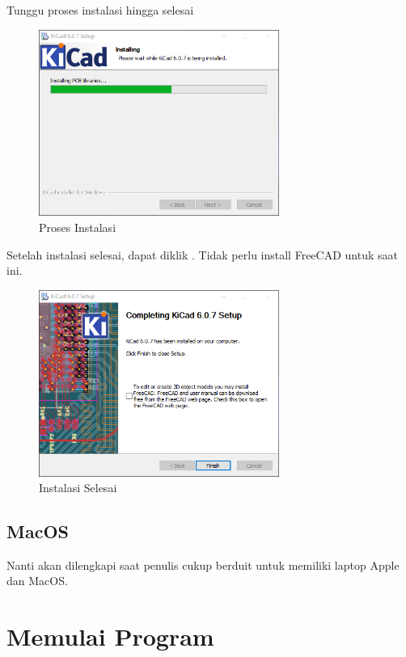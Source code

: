 \documentclass[12pt]{book}
\begin{document}
	\newpage
	Tunggu proses instalasi hingga selesai

	\begin{figure}[!ht]
		\centering
		\includegraphics[width=0.7\textwidth]{images/installations/kicad_install_2}
		\caption{Proses Instalasi}
	\end{figure}

	Setelah instalasi selesai, dapat diklik .
	Tidak perlu install FreeCAD untuk saat ini.

	\begin{figure}[!ht]
		\centering
		\includegraphics[width=0.7\textwidth]{images/installations/kicad_install_3}
		\caption{Instalasi Selesai}
	\end{figure}

	\newpage
	\subsection{MacOS}
	Nanti akan dilengkapi saat penulis cukup berduit untuk memiliki laptop Apple dan MacOS.

	\section{Memulai Program}
\end{document}
